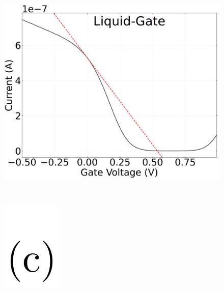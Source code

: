 \documentclass[
  letterpaper,
  DIV=11,
  numbers=noendperiod]{scrartcl}
\begin{document}
\begin{figure}
%
\begin{minipage}{0.01\linewidth}
~\end{minipage}%
%
\begin{minipage}{0.45\linewidth}
\includegraphics{figures/ch2/NTQ31C5ch1transconductance.png}\end{minipage}%
%
\begin{minipage}{0.01\linewidth}
~\end{minipage}%
\newline
\begin{minipage}{0.03\linewidth}
\includegraphics{figures/(c).png}\end{minipage}%
%
\begin{minipage}{0.01\linewidth}
~\end{minipage}%
%
\begin{minipage}{0.45\linewidth}

\end{minipage}
\end{figure}
\end{document}
